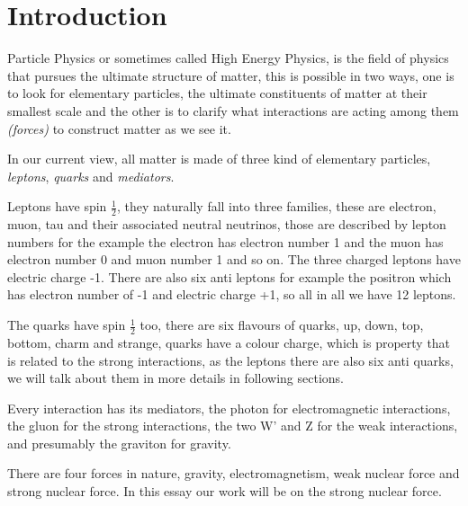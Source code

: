 \chapter{Introduction}
Particle Physics or sometimes called High Energy Physics, 
is the field of physics that pursues the ultimate structure of matter, this is 
possible in two ways, one is to look for elementary particles, the ultimate constituents of matter at their smallest scale and the other is to clarify what interactions are acting among them
 \emph{(forces)}
to construct matter as we see it.

In our current view, all matter is made of three kind of elementary particles, \emph{leptons}, \emph{quarks} and \emph{mediators}.

Leptons have spin $\frac{1}{2}$, they naturally fall into three families, these are electron, muon, tau and their associated neutral neutrinos, those are described by lepton numbers for the example the electron has electron number 1 and the muon has electron number 0 and muon number 1 and so on. The three charged leptons have electric  charge -1. There are also six anti leptons for example the positron which has electron number of -1 and electric charge +1, so all in all we have 12 leptons.

The quarks have spin $\frac{1}{2}$ too, there are six flavours of quarks, up, down, top, bottom, charm and strange, quarks have a colour charge, which is property that is related to the strong interactions,  as the leptons there are also six anti quarks, we will talk about them in more details in following sections. 

Every interaction has its mediators, the photon for electromagnetic interactions, the gluon for the strong interactions, the two W' and Z for the weak interactions, and presumably the graviton for gravity.            
 
There are four forces in nature, gravity, electromagnetism, weak nuclear force and strong nuclear force. In this essay our work will be on the strong nuclear force. 

